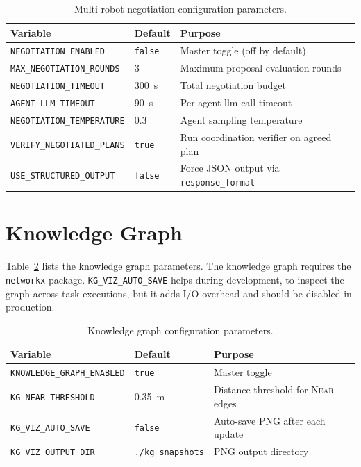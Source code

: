 \documentclass[
     12pt,
     a4paper,
     BCOR=10mm,
     DIV=14,
     listof=totoc,
     bibliography=totoc,
     parskip,
     twoside,
     headsepline
     ]{scrreprt}
\begin{document}
\begin{table}[ht]
	\centering
	\begin{tabular}{lll}
		\toprule
		\textbf{Variable}                  & \textbf{Default} & \textbf{Purpose}                                \\
		\midrule
		\texttt{NEGOTIATION\_ENABLED}      & \texttt{false}   & Master toggle (off by default)                  \\
		\texttt{MAX\_NEGOTIATION\_ROUNDS}  & 3                & Maximum proposal-evaluation rounds              \\
		\texttt{NEGOTIATION\_TIMEOUT}      & 300~s            & Total negotiation budget                        \\
		\texttt{AGENT\_LLM\_TIMEOUT}       & 90~s             & Per-agent \gls{llm} call timeout                \\
		\texttt{NEGOTIATION\_TEMPERATURE}  & 0.3              & Agent sampling temperature                      \\
		\texttt{VERIFY\_NEGOTIATED\_PLANS} & \texttt{true}    & Run coordination verifier on agreed plan        \\
		\texttt{USE\_STRUCTURED\_OUTPUT}   & \texttt{false}   & Force JSON output via \texttt{response\_format} \\
		\bottomrule
	\end{tabular}
	\caption{Multi-robot negotiation configuration parameters.}
	\label{tab:config_negotiation}
\end{table}

\section{Knowledge Graph}\label{appendix:config:kg}
Table~\ref{tab:config_kg} lists the knowledge graph parameters. The knowledge graph requires the \texttt{networkx} package. \texttt{KG\_VIZ\_AUTO\_SAVE} helps during development, to inspect the graph across task executions, but it adds I/O overhead and should be disabled in production.

\begin{table}[ht]
	\centering
	\begin{tabular}{lll}
		\toprule
		\textbf{Variable}                  & \textbf{Default}         & \textbf{Purpose}                           \\
		\midrule
		\texttt{KNOWLEDGE\_GRAPH\_ENABLED} & \texttt{true}            & Master toggle                              \\
		\texttt{KG\_NEAR\_THRESHOLD}       & 0.35~m                   & Distance threshold for \textsc{Near} edges \\
		\texttt{KG\_VIZ\_AUTO\_SAVE}       & \texttt{false}           & Auto-save PNG after each update            \\
		\texttt{KG\_VIZ\_OUTPUT\_DIR}      & \texttt{./kg\_snapshots} & PNG output directory                       \\
		\bottomrule
	\end{tabular}
	\caption{Knowledge graph configuration parameters.}
	\label{tab:config_kg}
\end{table}
\end{document}
